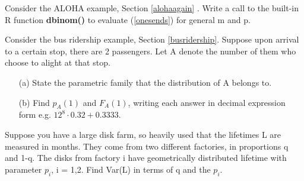 
\oneproblem Consider the ALOHA example, Section \ref{alohaagain} .
Write a call to the built-in R function {\bf dbinom()} to evaluate
(\ref{onesends}) for general m and p.

\oneproblem Consider the bus ridership example, Section
\ref{busridership}.  Suppose upon arrival to a certain stop, there are 2
passengers.  Let A denote the number of them who choose to alight at
that stop.

\begin{itemize}

\item [(a)] State the parametric family that the distribution of A
belongs to.

\item [(b)] Find $p_A(1)$ and $F_A(1)$, writing each answer in
decimal expression form e.g. $12^8 \cdot 0.32 + 0.3333$.

\end{itemize}

\oneproblem
Suppose you have a large disk farm, so heavily used that the lifetimes L
are measured in months. They come from two different factories, in
proportions q and 1-q. The disks from factory i have geometrically
distributed lifetime with parameter $p_i$, i = 1,2. Find Var(L) in terms of
q and the $p_i$. 
